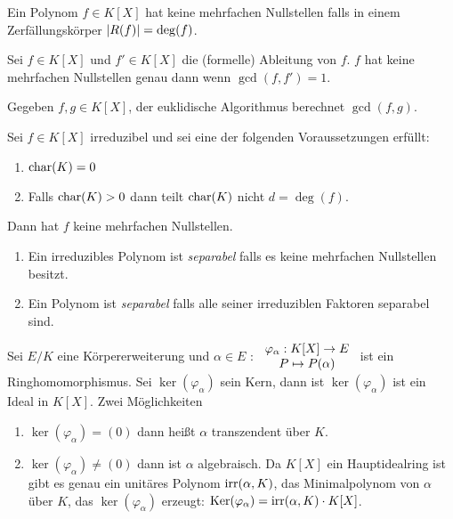 \begin{definition}
	Ein Polynom $f \in K[X]$ hat keine mehrfachen Nullstellen falls in einem Zerfällungskörper $\abs{R(f)} = \deg(f)$.
\end{definition}

\begin{lemma}[Übung]
	Sei $f \in K[X]$ und $f' \in K[X]$ die (formelle) Ableitung von $f$.
	$f$ hat keine mehrfachen Nullstellen genau dann wenn $\gcd(f,f') = 1$.
\end{lemma}

\begin{remark}
	Gegeben $f,g \in K[X]$, der euklidische Algorithmus berechnet $\gcd(f,g)$.
\end{remark}

\begin{corollary}
	Sei $f \in K[X]$ irreduzibel und sei eine der folgenden Voraussetzungen erfüllt:
	\begin{enumerate}[(1)]
		\item $\operatorname{char}(K) = 0$
		\item  Falls $\operatorname{char}(K) > 0$ dann teilt $\operatorname{char}(K)$ nicht $d = \deg(f)$.
	\end{enumerate}
	Dann hat $f$ keine mehrfachen Nullstellen.
\end{corollary}


\begin{definition}
	\begin{enumerate}[(1)]
		\item Ein irreduzibles Polynom ist \emph{separabel} falls es keine mehrfachen Nullstellen besitzt.
		\item Ein Polynom ist \emph{separabel} falls alle seiner irreduziblen Faktoren separabel sind. 
	\end{enumerate}
\end{definition}


\begin{definition}[Wiederholung]
	Sei $E / K$ eine Körpererweiterung und $\alpha \in E$ : $\begin{array}{c}  \varphi_{\alpha}: K[X] \to E\\ P \mapsto P(\alpha)\\ \end{array}$ ist ein Ringhomomorphismus.
Sei $\ker(\varphi_{\alpha})$ sein Kern, dann ist $\ker(\varphi_{\alpha})$ ist ein Ideal in $K[X]$.
Zwei Möglichkeiten
\begin{enumerate}[(1)]
	\item $\ker(\varphi_{\alpha}) = (0)$ dann heißt $\alpha$ transzendent über $K$.
	\item $\ker(\varphi_{\alpha}) \neq (0)$ dann ist $\alpha$ algebraisch.
		Da $K[X]$ ein Hauptidealring ist gibt es genau ein unitäres Polynom $\operatorname{irr}(\alpha,K)$,
		das Minimalpolynom von $\alpha$ über $K$, das $\ker(\varphi_{\alpha})$ erzeugt: $\operatorname{Ker}(\varphi_{\alpha}) = \operatorname{irr}(\alpha,K) \cdot K[X]$.
\end{enumerate}
\end{definition}

